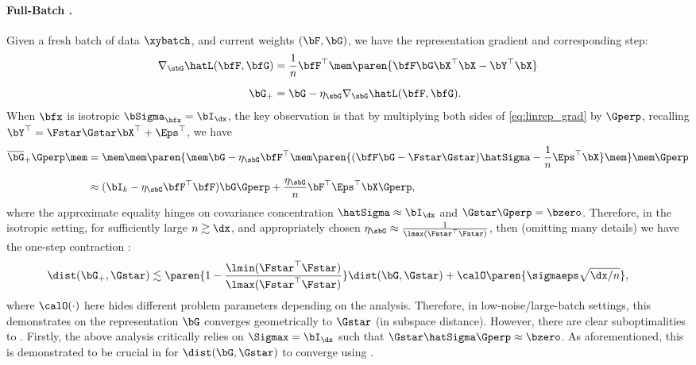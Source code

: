 \paragraph{Full-Batch \SGD.}
Given a fresh batch of data $\xybatch$, and current weights $(\bF, \bG)$, we have the representation gradient and corresponding \SGD step:
\begin{align}
    \nabla_{\sbG} \hatL(\bfF, \bfG) &= \frac{1}{n}\bfF^\top \mem\paren{\bfF \bG \bX^\top \bX - \bY^\top \bX} \nonumber \\[0.2cm]
    \bG_+ &= \bG - \eta_\sbG \nabla_{\sbG} \hatL(\bfF, \bfG). \label{eq:linrep_grad}
\end{align}
When $\bfx$ is isotropic $\bSigma_\bfx = \bI_{\dx}$, the key observation is that by multiplying both sides of \eqref{eq:linrep_grad} by $\Gperp$, recalling $\bY^\top  = \Fstar \Gstar \bX^\top + \Eps^\top$, we have
\begin{align*}
    \overline\bG_+\Gperp \mem&= \mem\mem\paren{\mem\bG - \eta_\sbG \bfF^\top\mem\paren{(\bfF \bG - \Fstar \Gstar) \hatSigma - \frac{1}{n}\Eps^\top \bX}\mem}\mem\Gperp \\[0.2cm]
    &\approx (\bI_{k} - \eta_\sbG \bfF^\top \bfF) \bG \Gperp  + \frac{\eta_\sbG}{n} \bF^\top \Eps^\top \bX \Gperp,
\end{align*}
where the approximate equality hinges on covariance concentration $\hatSigma \approx \bI_{\dx}$ and $\Gstar\Gperp = \bzero$. Therefore, in the isotropic setting, for sufficiently large $n \gtrsim \dx$, and appropriately chosen $\eta_\sbG \approx \frac{1}{\lmax(\Fstar^\top \Fstar)}$, then (omitting many details) we have the one-step contraction \citep{collins2021exploiting, vaswani2024efficient}:
\begin{align}
        \hspace{-0.3cm}\dist(\bG_+, \Gstar) &\lesssim \paren{1 - \frac{\lmin(\Fstar^\top \Fstar)}{\lmax(\Fstar^\top \Fstar)}} \dist(\bG, \Gstar)+ \calO\paren{\sigmaeps \sqrt{\dx/n}}, \label{eq:SGD_onestep}
\end{align}
where $\calO(\cdot)$ here hides different problem parameters depending on the analysis.
Therefore, in low-noise/large-batch settings, this demonstrates \SGD  on the representation $\bG$ converges geometrically to $\Gstar$ (in subspace distance). However, there are clear suboptimalities to \SGD. Firstly, the above analysis critically relies on $\Sigmax = \bI_{\dx}$ such that $\Gstar \hatSigma \Gperp \approx \bzero$. As aforementioned, this is demonstrated to be crucial in \citet{zhang2023meta} for $\dist(\bG, \Gstar)$ to converge using \SGD.
